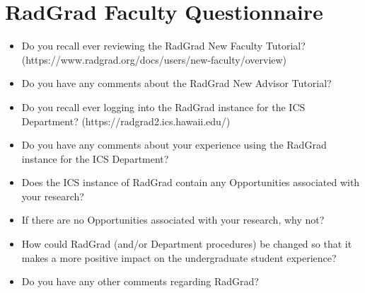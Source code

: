 \documentclass[acmsmall]{acmart}
\begin{document}
\section{RadGrad Faculty Questionnaire}
\label{sec:faculty-questionnaire}

\begin{itemize}
\item Do you recall ever reviewing the RadGrad New Faculty Tutorial? \newline (https://www.radgrad.org/docs/users/new-faculty/overview)
\item Do you have any comments about the RadGrad New Advisor Tutorial?
\item Do you recall ever logging into the RadGrad instance for the ICS Department? \newline (https://radgrad2.ics.hawaii.edu/)
\item Do you have any comments about your experience using the RadGrad instance for the ICS Department?
\item Does the ICS instance of RadGrad contain any Opportunities associated with your research?
\item If there are no Opportunities associated with your research, why not?
\item How could RadGrad (and/or Department procedures) be changed so that it makes a more positive impact on the undergraduate student experience?
\item Do you have any other comments regarding RadGrad?
\end{itemize}





\end{document}
